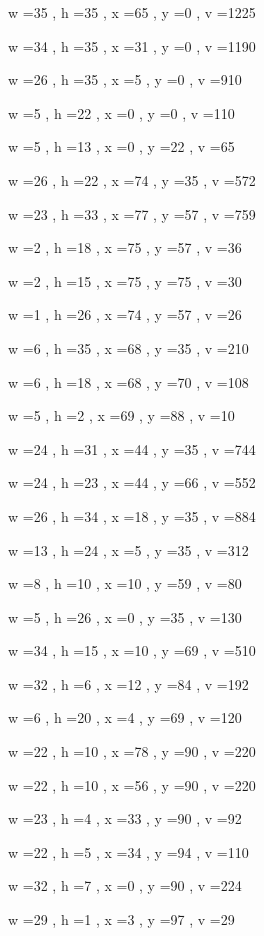\documentclass[11pt]{article}
\begin{document}
w =35 , h =35 , x =65 , y =0 , v =1225
\par
w =34 , h =35 , x =31 , y =0 , v =1190
\par
w =26 , h =35 , x =5 , y =0 , v =910
\par
w =5 , h =22 , x =0 , y =0 , v =110
\par
w =5 , h =13 , x =0 , y =22 , v =65
\par
w =26 , h =22 , x =74 , y =35 , v =572
\par
w =23 , h =33 , x =77 , y =57 , v =759
\par
w =2 , h =18 , x =75 , y =57 , v =36
\par
w =2 , h =15 , x =75 , y =75 , v =30
\par
w =1 , h =26 , x =74 , y =57 , v =26
\par
w =6 , h =35 , x =68 , y =35 , v =210
\par
w =6 , h =18 , x =68 , y =70 , v =108
\par
w =5 , h =2 , x =69 , y =88 , v =10
\par
w =24 , h =31 , x =44 , y =35 , v =744
\par
w =24 , h =23 , x =44 , y =66 , v =552
\par
w =26 , h =34 , x =18 , y =35 , v =884
\par
w =13 , h =24 , x =5 , y =35 , v =312
\par
w =8 , h =10 , x =10 , y =59 , v =80
\par
w =5 , h =26 , x =0 , y =35 , v =130
\par
w =34 , h =15 , x =10 , y =69 , v =510
\par
w =32 , h =6 , x =12 , y =84 , v =192
\par
w =6 , h =20 , x =4 , y =69 , v =120
\par
w =22 , h =10 , x =78 , y =90 , v =220
\par
w =22 , h =10 , x =56 , y =90 , v =220
\par
w =23 , h =4 , x =33 , y =90 , v =92
\par
w =22 , h =5 , x =34 , y =94 , v =110
\par
w =32 , h =7 , x =0 , y =90 , v =224
\par
w =29 , h =1 , x =3 , y =97 , v =29
\par
\newpage
\end{document}
